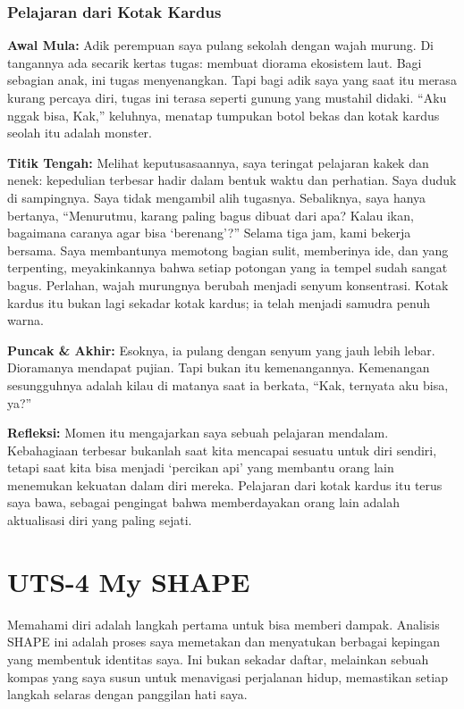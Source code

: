 \documentclass[
  letterpaper,
  DIV=11,
  numbers=noendperiod]{scrreprt}
\begin{document}
\subsection{Pelajaran dari Kotak
Kardus}\label{pelajaran-dari-kotak-kardus}

\textbf{Awal Mula:} Adik perempuan saya pulang sekolah dengan wajah
murung. Di tangannya ada secarik kertas tugas: membuat diorama ekosistem
laut. Bagi sebagian anak, ini tugas menyenangkan. Tapi bagi adik saya
yang saat itu merasa kurang percaya diri, tugas ini terasa seperti
gunung yang mustahil didaki. ``Aku nggak bisa, Kak,'' keluhnya, menatap
tumpukan botol bekas dan kotak kardus seolah itu adalah monster.

\textbf{Titik Tengah:} Melihat keputusasaannya, saya teringat pelajaran
kakek dan nenek: kepedulian terbesar hadir dalam bentuk waktu dan
perhatian. Saya duduk di sampingnya. Saya tidak mengambil alih tugasnya.
Sebaliknya, saya hanya bertanya, ``Menurutmu, karang paling bagus dibuat
dari apa? Kalau ikan, bagaimana caranya agar bisa `berenang'?'' Selama
tiga jam, kami bekerja bersama. Saya membantunya memotong bagian sulit,
memberinya ide, dan yang terpenting, meyakinkannya bahwa setiap potongan
yang ia tempel sudah sangat bagus. Perlahan, wajah murungnya berubah
menjadi senyum konsentrasi. Kotak kardus itu bukan lagi sekadar kotak
kardus; ia telah menjadi samudra penuh warna.

\textbf{Puncak \& Akhir:} Esoknya, ia pulang dengan senyum yang jauh
lebih lebar. Dioramanya mendapat pujian. Tapi bukan itu kemenangannya.
Kemenangan sesungguhnya adalah kilau di matanya saat ia berkata, ``Kak,
ternyata aku bisa, ya?''

\textbf{Refleksi:} Momen itu mengajarkan saya sebuah pelajaran mendalam.
Kebahagiaan terbesar bukanlah saat kita mencapai sesuatu untuk diri
sendiri, tetapi saat kita bisa menjadi `percikan api' yang membantu
orang lain menemukan kekuatan dalam diri mereka. Pelajaran dari kotak
kardus itu terus saya bawa, sebagai pengingat bahwa memberdayakan orang
lain adalah aktualisasi diri yang paling sejati.


\chapter{UTS-4 My SHAPE}\label{uts-4-my-shape}

Memahami diri adalah langkah pertama untuk bisa memberi dampak. Analisis
SHAPE ini adalah proses saya memetakan dan menyatukan berbagai kepingan
yang membentuk identitas saya. Ini bukan sekadar daftar, melainkan
sebuah kompas yang saya susun untuk menavigasi perjalanan hidup,
memastikan setiap langkah selaras dengan panggilan hati saya.
\end{document}
